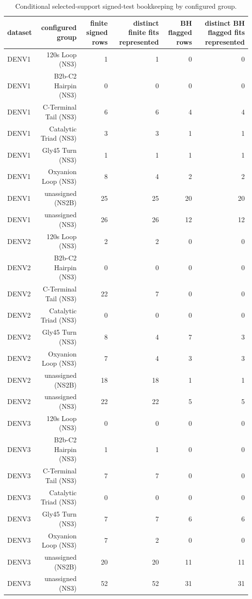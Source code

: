 \begin{table}[t]
  \centering
  \caption{Conditional selected-support signed-test bookkeeping by configured group.}
  \label{tab:conditional_signed_bookkeeping}
  \begin{tabular}{lrrrrr}
    \toprule
    dataset & configured group & finite signed rows & distinct finite fits represented & BH flagged rows & distinct BH flagged fits represented \\
    \midrule
    DENV1 & 120s Loop (NS3) & 1 & 1 & 0 & 0 \\
    DENV1 & B2b-C2 Hairpin (NS3) & 0 & 0 & 0 & 0 \\
    DENV1 & C-Terminal Tail (NS3) & 6 & 6 & 4 & 4 \\
    DENV1 & Catalytic Triad (NS3) & 3 & 3 & 1 & 1 \\
    DENV1 & Gly45 Turn (NS3) & 1 & 1 & 1 & 1 \\
    DENV1 & Oxyanion Loop (NS3) & 8 & 4 & 2 & 2 \\
    DENV1 & unassigned (NS2B) & 25 & 25 & 20 & 20 \\
    DENV1 & unassigned (NS3) & 26 & 26 & 12 & 12 \\
    DENV2 & 120s Loop (NS3) & 2 & 2 & 0 & 0 \\
    DENV2 & B2b-C2 Hairpin (NS3) & 0 & 0 & 0 & 0 \\
    DENV2 & C-Terminal Tail (NS3) & 22 & 7 & 0 & 0 \\
    DENV2 & Catalytic Triad (NS3) & 0 & 0 & 0 & 0 \\
    DENV2 & Gly45 Turn (NS3) & 8 & 4 & 7 & 3 \\
    DENV2 & Oxyanion Loop (NS3) & 7 & 4 & 3 & 3 \\
    DENV2 & unassigned (NS2B) & 18 & 18 & 1 & 1 \\
    DENV2 & unassigned (NS3) & 22 & 22 & 5 & 5 \\
    DENV3 & 120s Loop (NS3) & 0 & 0 & 0 & 0 \\
    DENV3 & B2b-C2 Hairpin (NS3) & 1 & 1 & 0 & 0 \\
    DENV3 & C-Terminal Tail (NS3) & 7 & 7 & 0 & 0 \\
    DENV3 & Catalytic Triad (NS3) & 0 & 0 & 0 & 0 \\
    DENV3 & Gly45 Turn (NS3) & 7 & 7 & 6 & 6 \\
    DENV3 & Oxyanion Loop (NS3) & 7 & 2 & 0 & 0 \\
    DENV3 & unassigned (NS2B) & 20 & 20 & 11 & 11 \\
    DENV3 & unassigned (NS3) & 52 & 52 & 31 & 31 \\

\end{tabular}
\end{table}
